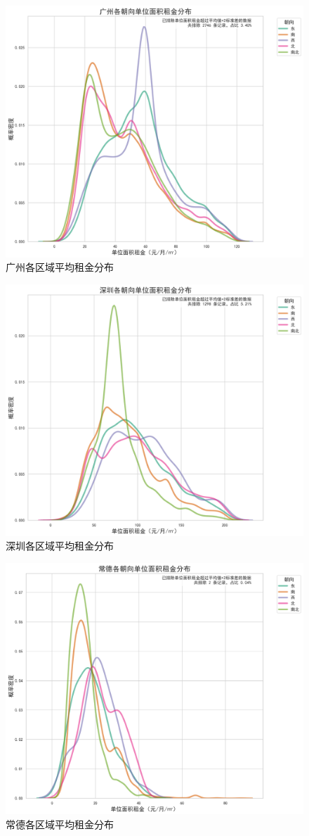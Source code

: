 \begin{figure}[htbp]
    \centering
    \includegraphics[width=0.7\linewidth]{../../figure/gz_direction_unit_price_distribution.png}
    \caption{广州各区域平均租金分布}
    \label{fig:gz_direction_unit_price_distribution}
\end{figure}
\begin{figure}[htbp]
    \centering
    \includegraphics[width=0.7\linewidth]{../../figure/sz_direction_unit_price_distribution.png}
    \caption{深圳各区域平均租金分布}
    \label{fig:sz_direction_unit_price_distribution}
\end{figure}
\begin{figure}[htbp]
    \centering
    \includegraphics[width=0.7\linewidth]{../../figure/changde_direction_unit_price_distribution.png}
    \caption{常德各区域平均租金分布}
    \label{fig:changde_direction_unit_price_distribution}
\end{figure}

